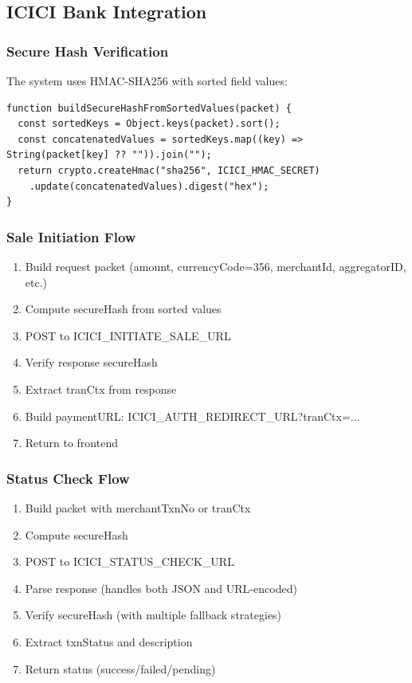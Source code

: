 \documentclass[12pt,a4paper]{article}
\begin{document}
\subsection{ICICI Bank Integration}

\subsubsection{Secure Hash Verification}
The system uses HMAC-SHA256 with sorted field values:
\begin{lstlisting}
function buildSecureHashFromSortedValues(packet) {
  const sortedKeys = Object.keys(packet).sort();
  const concatenatedValues = sortedKeys.map((key) => String(packet[key] ?? "")).join("");
  return crypto.createHmac("sha256", ICICI_HMAC_SECRET)
    .update(concatenatedValues).digest("hex");
}
\end{lstlisting}

\subsubsection{Sale Initiation Flow}
\begin{enumerate}
  \item Build request packet (amount, currencyCode=356, merchantId, aggregatorID, etc.)
  \item Compute secureHash from sorted values
  \item POST to ICICI\_INITIATE\_SALE\_URL
  \item Verify response secureHash
  \item Extract tranCtx from response
  \item Build paymentURL: ICICI\_AUTH\_REDIRECT\_URL?tranCtx=...
  \item Return to frontend
\end{enumerate}

\subsubsection{Status Check Flow}
\begin{enumerate}
  \item Build packet with merchantTxnNo or tranCtx
  \item Compute secureHash
  \item POST to ICICI\_STATUS\_CHECK\_URL
  \item Parse response (handles both JSON and URL-encoded)
  \item Verify secureHash (with multiple fallback strategies)
  \item Extract txnStatus and description
  \item Return status (success/failed/pending)
\end{enumerate}
\end{document}
